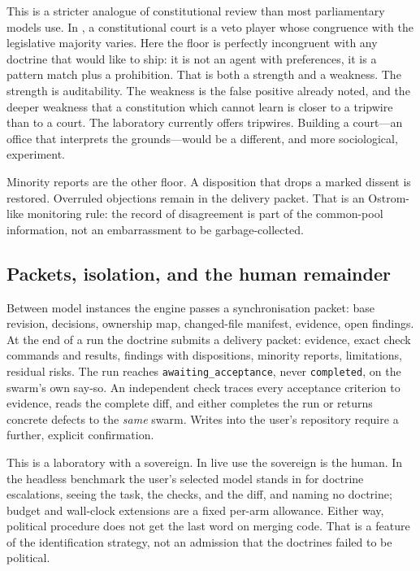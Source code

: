 \documentclass[11pt,a4paper]{article}
\begin{document}
This is a stricter analogue of constitutional review than most parliamentary models
use. In \citet{tsebelis2002}, a constitutional court is a veto player whose congruence
with the legislative majority varies. Here the floor is perfectly incongruent with any
doctrine that would like to ship: it is not an agent with preferences, it is a pattern
match plus a prohibition. That is both a strength and a weakness. The strength is
auditability. The weakness is the false positive already noted, and the deeper weakness
that a constitution which cannot learn is closer to a tripwire than to a court. The
laboratory currently offers tripwires. Building a court---an office that interprets the
grounds---would be a different, and more sociological, experiment.

Minority reports are the other floor. A disposition that drops a marked dissent is
restored. Overruled objections remain in the delivery packet. That is an Ostrom-like
monitoring rule: the record of disagreement is part of the common-pool information, not
an embarrassment to be garbage-collected.

\subsection{Packets, isolation, and the human remainder}

Between model instances the engine passes a synchronisation packet: base revision,
decisions, ownership map, changed-file manifest, evidence, open findings. At the end of
a run the doctrine submits a delivery packet: evidence, exact check commands and
results, findings with dispositions, minority reports, limitations, residual risks. The
run reaches \texttt{awaiting\_acceptance}, never \texttt{completed}, on the swarm's own
say-so. An independent check traces every acceptance criterion to evidence, reads the
complete diff, and either completes the run or returns concrete defects to the
\emph{same} swarm. Writes into the user's repository require a further, explicit
confirmation.

This is a laboratory with a sovereign. In live use the sovereign is the human. In the
headless benchmark the user's selected model stands in for doctrine escalations, seeing
the task, the checks, and the diff, and naming no doctrine; budget and wall-clock
extensions are a fixed per-arm allowance. Either way, political procedure does not get
the last word on merging code. That is a feature of the identification strategy, not an
admission that the doctrines failed to be political.
\end{document}
